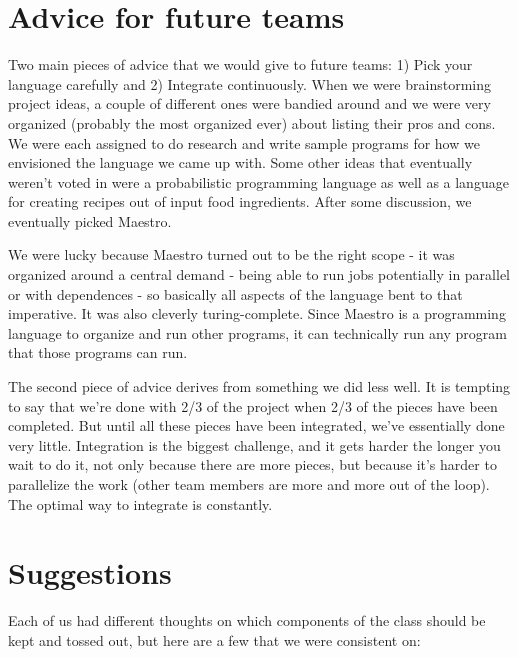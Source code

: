 \section{Advice for future teams}
Two main pieces of advice that we would give to future teams: 1) Pick your language carefully and 2) Integrate continuously. When we were brainstorming project ideas, a couple of different ones were bandied around and we were very organized (probably the most organized ever) about listing their pros and cons. We were each assigned to do research and write sample programs for how we envisioned the language we came up with. Some other ideas that eventually weren't voted in were a probabilistic programming language as well as a language for creating recipes out of input food ingredients. After some discussion, we eventually picked Maestro.

We were lucky because Maestro turned out to be the right scope - it was organized around a central demand - being able to run jobs potentially in parallel or with dependences - so basically all aspects of the language bent to that imperative. It was also cleverly turing-complete. Since Maestro is a programming language to organize and run other programs, it can technically run any program that those programs can run.

The second piece of advice derives from something we did less well. It is tempting to say that we're done with 2/3 of the project when 2/3 of the pieces have been completed. But until all these pieces have been integrated, we've essentially done very little. Integration is the biggest challenge, and it gets harder the longer you wait to do it, not only because there are more pieces, but because it's harder to parallelize the work (other team members are more and more out of the loop). The optimal way to integrate is constantly. 

\section{Suggestions}
Each of us had different thoughts on which components of the class should be kept and tossed out, but here are a few that we were consistent on:

